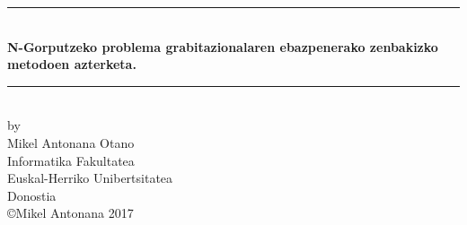 \begin{titlepage}
\newcommand{\HRule}{\rule{\linewidth}{0.5mm}}
\begin{center}
\HRule \\[0.4cm]
{ \Large \bfseries \sc N-Gorputzeko problema grabitazionalaren ebazpenerako zenbakizko metodoen azterketa.}\\[0.4cm]

\HRule \\[1cm]
by
\\[1cm]
{\Large Mikel Antonana Otano}
\\[.75cm]


{\large Informatika Fakultatea \\[.1cm]
Euskal-Herriko Unibertsitatea \\[.1cm]
Donostia}
\\[.5cm]

\copyright Mikel Antonana 2017
\end{center}
\end{titlepage}\pagebreak